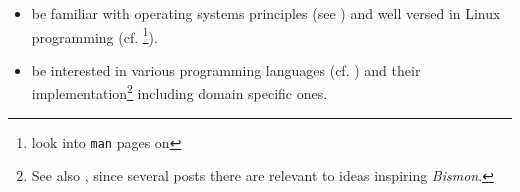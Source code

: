 \begin{itemize}
\item be familiar with operating systems principles
  (see \cite{Tanenbaum:92:OS,ArpaciDusseau14-Book}) and well
  versed in Linux programming
  (cf. \cite{Mitchell:2001:ALP,Kerrisk:2010:LinuxProgramming} \footnote{look
    into \texttt{man} pages on
    }).

  \item be interested in various 
     programming languages
    (cf. \cite{Abelson1996:SICP,Scott:2007:PLP,Queinnec:1996:LSP}) and
    their 
    implementation\footnote{See also
      , since several posts there are
      relevant to ideas inspiring \emph{Bismon}.}  including
       domain specific ones.


\end{itemize}
